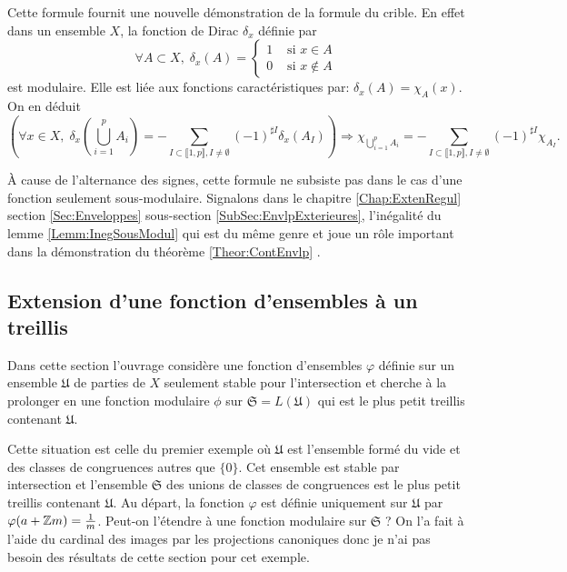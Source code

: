 \begin{rem}
  Cette formule fournit une nouvelle démonstration de la formule du crible. En effet dans un ensemble $X$, la fonction de Dirac $\delta_x$ définie par
  \begin{displaymath}
     \forall A \subset X, \;\delta_x(A) =
    \left\lbrace
    \begin{aligned}
      1 &\text{ si } x \in A \\
      0 &\text{ si } x \notin A
    \end{aligned}
    \right.
  \end{displaymath}
  est modulaire. Elle est liée aux fonctions caractéristiques par: $\delta_x(A) = \chi_A(x)$. On en déduit
  \begin{displaymath}
    \left( \forall x \in X, \; \delta_x(\bigcup_{i=1}^p A_i) = - \sum_{I \subset \llbracket 1,p \rrbracket, I\neq \emptyset} (-1)^{\sharp I}\delta_x(A_I) \right)
    \Rightarrow  \chi_{\bigcup_{i=1}^p A_i} = - \sum_{I \subset \llbracket 1,p \rrbracket, I\neq \emptyset} (-1)^{\sharp I}\chi_{A_I}.
  \end{displaymath}
\end{rem}
\begin{rem}
 À cause de l'alternance des signes, cette formule ne subsiste pas dans le cas d'une fonction seulement sous-modulaire. Signalons dans le chapitre \ref{Chap:ExtenRegul} section \ref{Sec:Enveloppes} sous-section \ref{SubSec:EnvlpExterieures}, l'inégalité du lemme \ref{Lemm:InegSousModul} qui est du même genre et joue un rôle important dans la démonstration du théorème \ref{Theor:ContEnvlp} .
\end{rem}

\subsection{Extension d'une fonction d'ensembles à un treillis}
Dans cette section l'ouvrage considère une fonction d'ensembles $\varphi$ définie sur un ensemble $\mathfrak{U}$ de parties de $X$ seulement stable pour l'intersection et cherche à la prolonger en une fonction modulaire $\phi$ sur $\mathfrak{S} = L(\mathfrak{U})$ qui est le plus petit treillis contenant $\mathfrak{U}$.

Cette situation est celle du premier exemple où $\mathfrak{U}$ est l'ensemble formé du vide et des classes de congruences autres que $\{0\}$. Cet ensemble est stable par intersection et l'ensemble $\mathfrak{S}$ des unions de classes de congruences est le plus petit treillis contenant $\mathfrak{U}$.
Au départ, la fonction $\varphi$ est définie uniquement sur $\mathfrak{U}$ par  $\varphi(a + \mathbb{Z} m) = \frac{1}{m}$.
Peut-on l'étendre à une fonction modulaire sur $\mathfrak{S}$ ? On l'a fait à l'aide du cardinal des images par les projections canoniques donc je n'ai pas besoin des résultats de cette section pour cet exemple.

